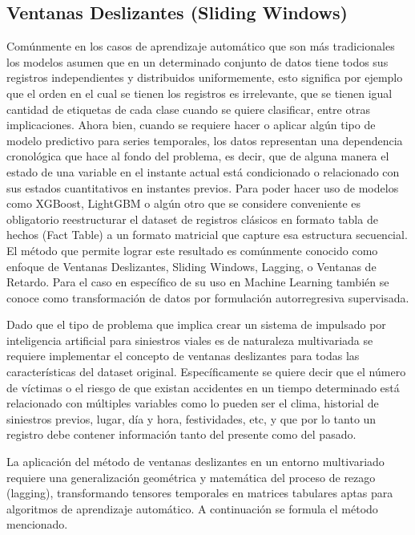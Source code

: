 \subsection{Ventanas Deslizantes (Sliding Windows)}\label{ventanas-deslizantes-sliding-windows}

Comúnmente en los casos de aprendizaje automático que son más tradicionales los modelos asumen que en un determinado conjunto de datos tiene todos sus registros independientes y distribuidos uniformemente, esto significa por ejemplo que el orden en el cual se tienen los registros es irrelevante, que se tienen igual cantidad de etiquetas de cada clase cuando se quiere clasificar, entre otras implicaciones. Ahora bien, cuando se requiere hacer  o aplicar algún tipo de modelo predictivo para series temporales, los datos representan una dependencia cronológica que hace al fondo del problema, es decir, que de alguna manera el estado de una variable en el instante actual está condicionado o relacionado con sus estados cuantitativos en instantes previos. Para poder hacer uso de modelos como XGBoost, LightGBM o algún otro que se considere conveniente es obligatorio reestructurar el dataset de registros clásicos en formato tabla de hechos (Fact Table) a un formato matricial que capture esa estructura secuencial. El método que permite lograr este resultado es comúnmente conocido como enfoque de Ventanas Deslizantes, Sliding Windows, Lagging, o Ventanas de Retardo. Para el caso en específico de su uso en Machine Learning también se conoce como transformación de datos por formulación autorregresiva supervisada.

Dado que el tipo de problema que implica crear un sistema de  impulsado por inteligencia artificial para siniestros viales es de naturaleza multivariada se requiere implementar el concepto de ventanas deslizantes para todas las características del dataset original. Específicamente se quiere decir que el número de víctimas o el riesgo de que existan accidentes en un tiempo determinado está relacionado con múltiples variables como lo pueden ser el clima, historial de siniestros previos, lugar, día y hora, festividades, etc, y que por lo tanto un registro debe contener información tanto del presente como del pasado.

La aplicación del método de ventanas deslizantes en un entorno multivariado requiere una generalización geométrica y matemática del proceso de rezago (lagging), transformando tensores temporales en matrices tabulares aptas para algoritmos de aprendizaje automático. A continuación se formula el método mencionado.

